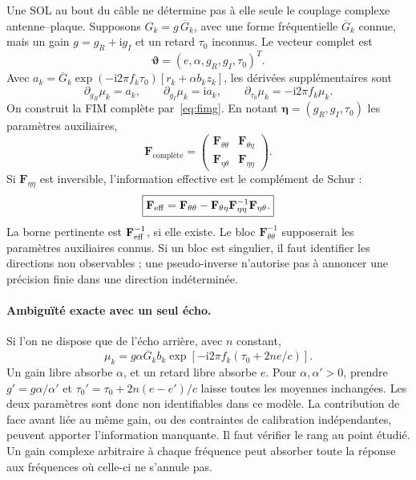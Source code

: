 \documentclass[11pt,a4paper]{article}
\newcommand{\ii}{\mathrm{i}}
\begin{document}
Une SOL au bout du câble ne détermine pas à elle seule le couplage complexe
antenne--plaque. Supposons $G_k=g\,\overline G_k$, avec une forme fréquentielle
$\overline G_k$ connue, mais un gain $g=g_R+\ii g_I$ et un retard $\tau_0$
inconnus. Le vecteur complet est
\begin{equation}
 \boldsymbol\vartheta=(e,\alpha,g_R,g_I,\tau_0)^T.
\end{equation}
Avec $a_k=\overline G_k\exp(-\ii2\pi f_k\tau_0)
[r_k+\alpha b_kz_k]$, les dérivées supplémentaires sont
\begin{equation}
 \partial_{g_R}\mu_k=a_k,\qquad
 \partial_{g_I}\mu_k=\ii a_k,\qquad
 \partial_{\tau_0}\mu_k=-\ii2\pi f_k\mu_k.
\end{equation}
On construit la FIM complète par~\eqref{eq:fimg}. En notant
$\boldsymbol\eta=(g_R,g_I,\tau_0)$ les paramètres auxiliaires,
\begin{equation}
 \mathbf F_{\text{complète}}=
 \begin{pmatrix}\mathbf F_{\theta\theta}&\mathbf F_{\theta\eta}\\
 \mathbf F_{\eta\theta}&\mathbf F_{\eta\eta}\end{pmatrix}.
\end{equation}
Si $\mathbf F_{\eta\eta}$ est inversible, l'information effective est
le complément de Schur :
\begin{equation}\label{eq:schur}
 \boxed{\mathbf F_{\rm eff}=\mathbf F_{\theta\theta}
 -\mathbf F_{\theta\eta}\mathbf F_{\eta\eta}^{-1}\mathbf F_{\eta\theta}.}
\end{equation}
La borne pertinente est $\mathbf F_{\rm eff}^{-1}$, si elle existe.
Le bloc $\mathbf F_{\theta\theta}^{-1}$ supposerait les paramètres auxiliaires
connus. Si un bloc est singulier, il faut identifier les directions non
observables ; une pseudo-inverse n'autorise pas à annoncer une précision
finie dans une direction indéterminée.

\paragraph{Ambiguïté exacte avec un seul écho.}
Si l'on ne dispose que de l'écho arrière, avec $n$ constant,
\begin{equation}
 \mu_k=g\alpha\overline G_k b_k
 \exp[-\ii2\pi f_k(\tau_0+2ne/c)].
\end{equation}
Un gain libre absorbe $\alpha$, et un retard libre absorbe $e$.
Pour $\alpha,\alpha'>0$, prendre $g'=g\alpha/\alpha'$ et
$\tau_0'=\tau_0+2n(e-e')/c$ laisse toutes les moyennes inchangées.
Les deux paramètres sont donc non identifiables dans ce modèle.
La contribution de face avant liée au même gain, ou des contraintes de
calibration indépendantes, peuvent apporter l'information manquante.
Il faut vérifier le rang au point étudié. Un gain complexe arbitraire
à chaque fréquence peut absorber toute la réponse aux fréquences où
celle-ci ne s'annule pas.
\end{document}
